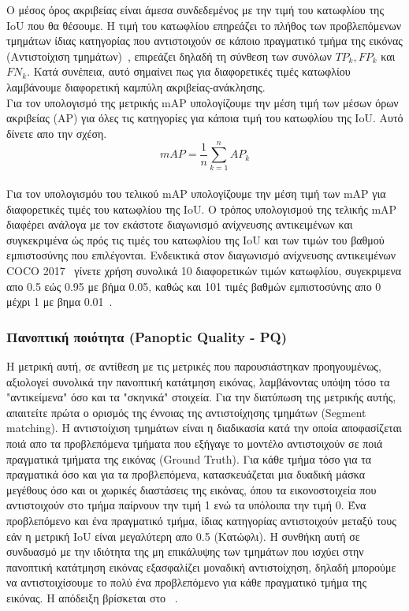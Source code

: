 \documentclass[12pt]{article}
\numberwithin{equation}{section}
\begin{document}
Ο μέσος όρος ακριβείας είναι άμεσα συνδεδεμένος με την τιμή του κατωφλίου της IoU που θα θέσουμε. Η τιμή του κατωφλίου επηρεάζει το πλήθος των προβλεπόμενων τμημάτων ίδιας κατηγορίας που αντιστοιχούν σε κάποιο πραγματικό τμήμα της εικόνας (Αντιστοίχιση τμημάτων)~\cite{Kirillov_2019_CVPR}, επιρεάζει δηλαδή τη σύνθεση των συνόλων \(TP_k, FP_k\) και \(FN_k\). Κατά συνέπεια, αυτό σημαίνει πως για διαφορετικές τιμές κατωφλίου λαμβάνουμε διαφορετική καμπύλη ακριβείας-ανάκλησης. \\

Για τον υπολογισμό της μετρικής mAP υπολογίζουμε την μέση τιμή των μέσων όρων ακριβείας (AP) για όλες τις κατηγορίες για κάποια τιμή του κατωφλίου της IoU. Αυτό δίνετε απο την σχέση. \\

\begin{equation}
mAP = \frac{1}{n} \sum_{k=1}^{n} AP_k
\end{equation}\\

Για τον υπολογισμόυ του τελικού mAP υπολογίζουμε την μέση τιμή των mAP για διαφορετικές τιμές του κατωφλίου της IoU. Ο τρόπος υπολογισμού της τελικής mAP διαφέρει ανάλογα με τον εκάστοτε διαγωνισμό ανίχνευσης αντικειμένων και συγκεκριμένα ώς πρός τις τιμές του κατωφλίου της IoU και των τιμών του βαθμού εμπιστοσύνης που επιλέγονται. Ενδεικτικά στον διαγωνισμό ανίχνευσης αντικειμένων COCO 2017~\cite{lin2015microsoftcococommonobjects} γίνετε χρήση συνολικά 10 διαφορετικών τιμών κατωφλίου, συγεκριμενα απο 0.5 εώς 0.95 με βήμα 0.05, καθώς και 101 τιμές βαθμών εμπιστοσύνης απο 0 μέχρι 1 με βημα 0.01~\cite{shah2022map}. \\



\subsubsection{Πανοπτική ποιότητα (Panoptic Quality - PQ)}

Η μετρική αυτή, σε αντίθεση με τις μετρικές που παρουσιάστηκαν προηγουμένως, αξιολογεί συνολικά την πανοπτική κατάτμηση εικόνας, λαμβάνοντας υπόψη τόσο τα "αντικείμενα" όσο και τα "σκηνικά" στοιχεία. Για την διατύπωση της μετρικής αυτής, απαιτείτε πρώτα ο ορισμός της έννοιας της αντιστοίχησης τμημάτων (Segment matching). Η αντιστοίχιση τμημάτων είναι η διαδικασία κατά την οποία αποφασίζεται ποιά απο τα προβλεπόμενα τμήματα που εξήγαγε το μοντέλο αντιστοιχούν σε ποιά πραγματικά τμήματα της εικόνας (Ground Truth). Για κάθε τμήμα τόσο για τα πραγματικά όσο και για τα προβλεπόμενα, κατασκευάζεται μια δυαδική μάσκα μεγέθους όσο και οι χωρικές διαστάσεις της εικόνας, όπου τα εικονοστοιχεία που αντιστοιχούν στο τμήμα παίρνουν την τιμή 1 ενώ τα υπόλοιπα την τιμή 0. Ένα προβλεπόμενο και ένα πραγματικό τμήμα, ίδιας κατηγορίας αντιστοιχούν μεταξύ τους εάν η μετρική IoU είναι μεγαλύτερη απο 0.5 (Κατώφλι). Η συνθήκη αυτή σε συνδυασμό με την ιδιότητα της μη επικάλυψης των τμημάτων που ισχύει στην πανοπτική κατάτμηση εικόνας εξασφαλίζει μοναδική αντιστοίχηση, δηλαδή μπορούμε να αντιστοιχίσουμε το πολύ ένα προβλεπόμενο για κάθε πραγματικό τμήμα της εικόνας. Η απόδειξη βρίσκεται στο ~\cite{Kirillov_2019_CVPR}.\\
\end{document}
